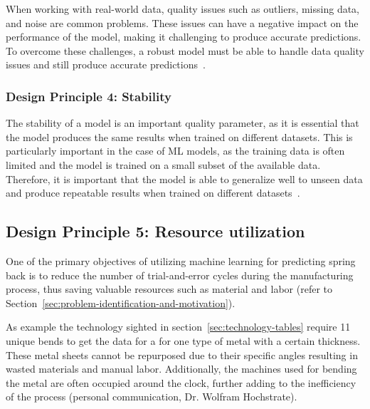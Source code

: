 When working with real-world data, quality issues such as outliers, missing data, and
noise are common problems.
These issues can have a negative impact on the performance of the model, making it challenging to produce accurate
predictions.
To overcome these challenges, a robust model must be able to handle data quality issues and still produce
accurate predictions~\cite[p. 16]{siebert2022construction}.


\subsubsection*{Design Principle 4: Stability}

The stability of a model is an important quality parameter, as it is essential that
the model produces the same results when trained on different datasets.
This is particularly important in the case of \ac{ML} models, as the training data
is often limited and the model is trained on a small subset of the available data.
Therefore, it is important that the model is able to generalize well to unseen data and
produce repeatable results when trained on different
datasets~\cite[p. 16]{siebert2022construction}.

\subsection*{Design Principle 5: Resource utilization}
One of the primary objectives of utilizing machine learning for predicting spring back is to
reduce the number of trial-and-error cycles during the manufacturing process, thus saving
valuable resources such as material and labor
(refer to Section~\ref{sec:problem-identification-and-motivation}).

As example the technology sighted in section~\ref{sec:technology-tables} require 11 unique bends to get the data
for a for one type of metal with a certain thickness.
These metal sheets cannot be repurposed due to their specific angles resulting in wasted materials and manual labor.
Additionally, the machines used for bending the metal are often occupied around the clock, further adding to the
inefficiency of the process (personal communication, Dr. Wolfram Hochstrate).

